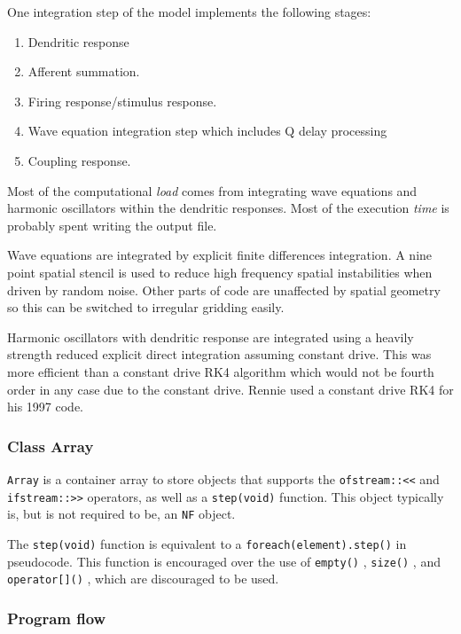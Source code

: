 \documentclass[12pt,a4paper]{article}
\newcommand{\type}[1]{{\small\small\tt #1} }
\begin{document}
One integration step of the model implements the following stages:

\begin{enumerate}
    \item  Dendritic response
    \item  Afferent summation.
    \item  Firing response/stimulus response.
    \item  Wave equation integration step which includes Q delay processing
    \item  Coupling response.
\end{enumerate}

Most of the computational {\em load} comes from integrating wave equations and harmonic oscillators within the dendritic responses. Most of the execution {\em time} is probably spent writing the output file.

Wave equations are integrated by explicit finite differences integration. A nine point spatial stencil is used to reduce high frequency spatial instabilities when driven by random noise. Other parts of code are unaffected by spatial geometry so this can be switched to irregular gridding easily.

Harmonic oscillators with dendritic response are integrated using a heavily strength reduced explicit direct integration assuming constant drive. This was more efficient than a constant drive RK4 algorithm which would not be fourth order in any case due to the constant drive. Rennie used a constant drive RK4 for his 1997 code.

\subsubsection{Class Array}
\label{sec:array}

\type{Array} is a container array to store objects that supports the \type{ofstream::<<} and \type{ifstream::>>} operators, as well as a \type{step(void)} function. This object typically is, but is not required to be, an \type{NF} object.

The \type{step(void)} function is equivalent to a \type{foreach(element).step()} in pseudocode. This function is encouraged over the use of \type{empty()}, \type{size()}, and \type{operator[]()}, which are discouraged to be used.

\subsubsection{Program flow}
\end{document}
